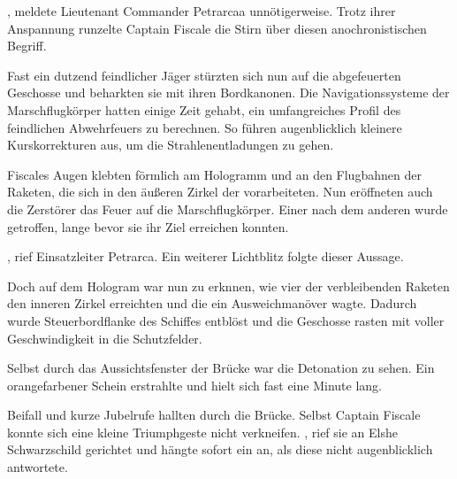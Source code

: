 , meldete Lieutenant Commander Petrarcaa unnötigerweise.  Trotz ihrer Anspannung runzelte Captain Fiscale die Stirn über diesen anochronistischen Begriff.

\par

Fast ein dutzend feindlicher Jäger stürzten sich nun auf die abgefeuerten Geschosse und beharkten sie mit ihren Bordkanonen. Die Navigationssysteme der Marschflugkörper hatten einige Zeit gehabt, ein umfangreiches Profil des feindlichen Abwehrfeuers zu berechnen. So führen augenblicklich kleinere Kurskorrekturen aus, um die Strahlenentladungen zu gehen.

\par

Fiscales Augen klebten förmlich am Hologramm und an den Flugbahnen der Raketen, die sich in den äußeren Zirkel der  vorarbeiteten. Nun eröffneten auch die Zerstörer das Feuer auf die Marschflugkörper. Einer nach dem anderen wurde getroffen, lange bevor sie ihr Ziel erreichen konnten.

\par

, rief Einsatzleiter Petrarca.  Ein weiterer Lichtblitz folgte dieser Aussage.

\par

Doch auf dem Hologram war nun zu erknnen, wie vier der verbleibenden Raketen den inneren Zirkel erreichten und die  ein Ausweichmanöver wagte. Dadurch wurde Steuerbordflanke des Schiffes entblöst und die Geschosse rasten mit voller Geschwindigkeit in die Schutzfelder.

\par

Selbst durch das Aussichtsfenster der Brücke war die Detonation zu sehen. Ein orangefarbener Schein erstrahlte und hielt sich fast eine Minute lang.

\par

Beifall und kurze Jubelrufe hallten durch die Brücke. Selbst Captain Fiscale konnte sich eine kleine Triumphgeste nicht verkneifen. , rief sie an Elshe Schwarzschild gerichtet und hängte sofort ein  an, als diese nicht augenblicklich antwortete.

\par

